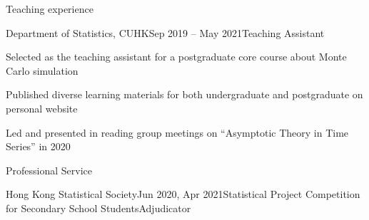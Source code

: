 \documentclass[10pt]{resume} %
\begin{document}
%
%


\begin{rSection}{Teaching experience}

\begin{rSubsection}{Department of Statistics, CUHK}{Sep 2019 -- May 2021}{Teaching Assistant}{}
\item Selected as the teaching assistant for a postgraduate core course about Monte Carlo simulation
\item Published diverse learning materials for both undergraduate and postgraduate on personal website
\item Led and presented in reading group meetings on ``Asymptotic Theory in Time Series'' in 2020
\end{rSubsection}

\end{rSection}


\begin{rSection}{Professional Service}

\begin{rSecitem}{Hong Kong Statistical Society}{Jun 2020, Apr 2021}{Statistical Project Competition for Secondary School Students}{Adjudicator}
\end{rSecitem}

\end{rSection}

\end{document}

